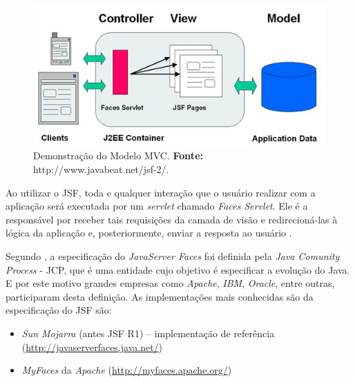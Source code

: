 \begin{figure}[h!]
	\centerline{\includegraphics[scale=0.5]{./imagens/jsf_using_mvc.jpg}}
	\caption[Demonstração do Modelo MVC]
	{Demonstração do Modelo MVC. \textbf{Fonte:}
	http://www.javabeat.net/jsf-2/.}
	\label{fig:exemplo3}
\end{figure}

\par Ao utilizar o JSF, toda e qualquer interação que o usuário realizar com a aplicação será executada por 
um \textit{servlet} chamado \textit{Faces Servlet}. Ele é a responsável por
receber tais requisições da camada de visão e redirecioná-las à lógica da aplicação e, posteriormente, enviar a resposta ao 
usuário \cite{faria_java_ee_7_jsf_primefaces_cdi}.

\par Segundo , a especificação do \textit{JavaServer
	Faces} foi definida pela \textit{Java Comunity Process} - JCP\footnotemark[4],
	que é uma entidade cujo objetivo é especificar a evolução do Java. E por este motivo grandes empresas como
\textit{Apache}, \textit{IBM}, \textit{Oracle}, entre outras, participaram
desta definição. As implementações mais conhecidas são da especificação do JSF são:


\begin{itemize}
	\item \textit{Sun Mojarra} (antes JSF R1) – implementação de referência
	(\url{http://javaserverfaces.java.net/})
	
	\item \textit{MyFaces} da \textit{Apache} (\url{http://myfaces.apache.org/})
\end{itemize}

